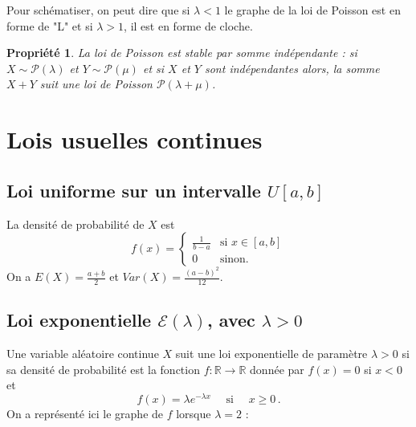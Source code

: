 \documentclass[12pt, a4paper]{book}
\newtheorem{prop}[thm]{Propriété}
\numberwithin{equation}{section}
\begin{document}
Pour schématiser, on peut dire que si $\lambda<1$ le graphe de la loi de Poisson est en forme de "L" et si 
$\lambda>1$, il est en forme de cloche.


\begin{prop}  La loi de Poisson est stable par somme indépendante : si $X\sim \mathcal{P}(\lambda)$ et $Y\sim \mathcal{P}(\mu)$ et si $X$ et $Y$ sont
indépendantes alors, la somme $X+Y$ suit une loi de Poisson $\mathcal{P}(\lambda+\mu)$.
\end{prop}


\section{Lois usuelles continues} 


\subsection[Loi uniforme sur un intervalle]{Loi uniforme sur un intervalle $U[a,b]$}
La densité de probabilité de $X$ est
$$
f(x)=\left \{
\begin{array}{ll}
\frac{1}{b-a} & {\mbox {si } } x \in [a,b] \\
0 & {\mbox{sinon. }}
\end{array}
\right.
$$
On a $E(X)=\frac{a+b}{2}$ et $Var(X)=\frac{(a-b)^2}{12}$.\\

\subsection[Loi exponentielle]{Loi exponentielle $\mathcal{E}(\lambda)$, avec $\lambda>0$}

Une variable aléatoire continue $X$ suit une loi exponentielle de paramètre $\lambda>0$ si sa densité de probabilité est la 
fonction $f:\mathbb{R}\longrightarrow \mathbb{R}$ donnée par  $f(x)=0$ si $x<0$ et
$$
f(x)=\lambda e^{-\lambda x}\quad {\mbox { si }}\quad  x\geq 0\,.
$$
On a représenté ici le graphe de $f$ lorsque $\lambda=2$ :

\begin{center}
\end{center}
\end{document}
